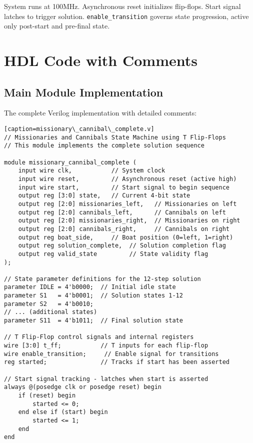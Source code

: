 \documentclass[10pt,a4paper]{article}
\begin{document}
System runs at 100MHz. Asynchronous reset initializes flip-flops. Start signal latches to trigger solution. \texttt{enable\_transition} governs state progression, active only post-start and pre-final state.


\section*{HDL Code with Comments}

\subsection*{Main Module Implementation}

The complete Verilog implementation with detailed comments:

\begin{lstlisting}[style=verilog][caption=missionary\_cannibal\_complete.v]
// Missionaries and Cannibals State Machine using T Flip-Flops
// This module implements the complete solution sequence

module missionary_cannibal_complete (
    input wire clk,           // System clock
    input wire reset,         // Asynchronous reset (active high)
    input wire start,         // Start signal to begin sequence
    output reg [3:0] state,   // Current 4-bit state
    output reg [2:0] missionaries_left,   // Missionaries on left
    output reg [2:0] cannibals_left,      // Cannibals on left
    output reg [2:0] missionaries_right,  // Missionaries on right
    output reg [2:0] cannibals_right,     // Cannibals on right
    output reg boat_side,     // Boat position (0=left, 1=right)
    output reg solution_complete,  // Solution completion flag
    output reg valid_state         // State validity flag
);

// State parameter definitions for the 12-step solution
parameter IDLE = 4'b0000;  // Initial idle state
parameter S1   = 4'b0001;  // Solution states 1-12
parameter S2   = 4'b0010;
// ... (additional states)
parameter S11  = 4'b1011;  // Final solution state

// T Flip-Flop control signals and internal registers
wire [3:0] t_ff;           // T inputs for each flip-flop
wire enable_transition;     // Enable signal for transitions
reg started;               // Tracks if start has been asserted

// Start signal tracking - latches when start is asserted
always @(posedge clk or posedge reset) begin
    if (reset) begin
        started <= 0;
    end else if (start) begin
        started <= 1;
    end
end


\end{lstlisting}
\end{document}

